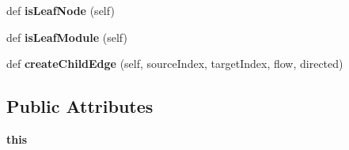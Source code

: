 \begin{DoxyCompactItemize}
\mbox{\label{classdsmacc_1_1graph_1_1infomap_1_1infomap_1_1LeafIterator_a898444cb7712c7fe880516d63aa43286}} 
def {\bfseries is\+Leaf\+Node} (self)
\item 
\mbox{\label{classdsmacc_1_1graph_1_1infomap_1_1infomap_1_1LeafIterator_a3a879a21b5f1ed5806f1d022ecae8fed}} 
def {\bfseries is\+Leaf\+Module} (self)
\item 
\mbox{\label{classdsmacc_1_1graph_1_1infomap_1_1infomap_1_1LeafIterator_a5747acfca647b061cdc21f5fff9d273f}} 
def {\bfseries create\+Child\+Edge} (self, source\+Index, target\+Index, flow, directed)
\end{DoxyCompactItemize}
\subsection*{Public Attributes}
\begin{DoxyCompactItemize}
\item 
\mbox{\label{classdsmacc_1_1graph_1_1infomap_1_1infomap_1_1LeafIterator_a3fcbcac20eb038dede704f0308a1207f}} 
{\bfseries this}
\end{DoxyCompactItemize}

